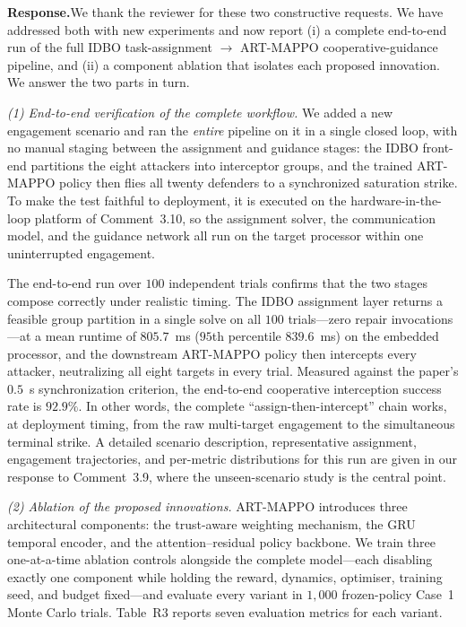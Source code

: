 \documentclass[11pt]{article}
\newcommand{\rsp}{\medskip\noindent\textbf{Response.}\quad}
\begin{document}
\rsp We thank the reviewer for these two constructive requests. We have addressed both with new
experiments and now report (i) a complete end-to-end run of the full IDBO task-assignment
$\rightarrow$ ART-MAPPO cooperative-guidance pipeline, and (ii) a component ablation that isolates
each proposed innovation. We answer the two parts in turn.

\medskip\noindent\emph{(1) End-to-end verification of the complete workflow.} We added a new
engagement scenario and ran the \emph{entire} pipeline on it in a single closed loop, with no
manual staging between the assignment and guidance stages: the IDBO front-end partitions the eight
attackers into interceptor groups, and the trained ART-MAPPO policy then flies all twenty defenders
to a synchronized saturation strike. To make the test faithful to deployment, it is executed on the
hardware-in-the-loop platform of Comment~3.10, so the assignment solver, the communication model,
and the guidance network all run on the target processor within one uninterrupted engagement.

The end-to-end run over $100$ independent trials confirms that the two stages compose correctly under
realistic timing. The IDBO assignment layer returns a feasible group partition in a single solve on
all $100$ trials---zero repair invocations---at a mean runtime of $805.7$~ms ($95$th percentile
$839.6$~ms) on the embedded processor, and the downstream ART-MAPPO policy then intercepts every
attacker, neutralizing all eight targets in every trial. Measured against the paper's $0.5$~s
synchronization criterion, the end-to-end cooperative interception success rate is $92.9\%$. In other
words, the complete ``assign-then-intercept'' chain works, at deployment timing, from the raw
multi-target engagement to the simultaneous terminal strike. A detailed scenario description,
representative assignment, engagement trajectories, and per-metric distributions for this run are
given in our response to Comment~3.9, where the unseen-scenario study is the central point.

\medskip\noindent\emph{(2) Ablation of the proposed innovations.}  ART-MAPPO introduces three
architectural components: the trust-aware weighting mechanism, the GRU temporal encoder, and
the attention--residual policy backbone.  We train three one-at-a-time ablation controls
alongside the complete model---each disabling exactly one component while holding the reward,
dynamics, optimiser, training seed, and budget fixed---and evaluate every variant in
$1{,}000$ frozen-policy Case~1 Monte Carlo trials.  Table~R3 reports seven evaluation metrics
for each variant.
\end{document}
